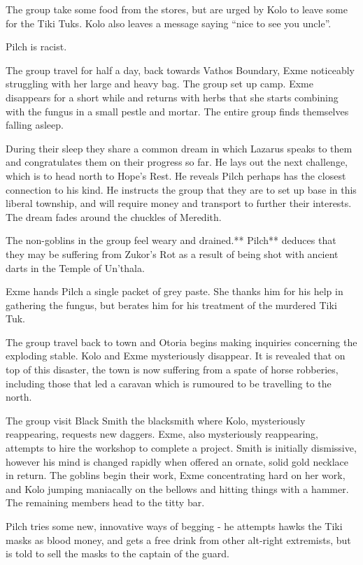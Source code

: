 The group take some food from the stores, but are urged by Kolo to leave some for the Tiki Tuks. Kolo also leaves a message saying “nice to see you uncle”.

Pilch is racist.

The group travel for half a day, back towards Vathos Boundary, Exme noticeably struggling with her large and heavy bag. The group set up camp. Exme disappears for a short while and returns with herbs that she starts combining with the fungus in a small pestle and mortar. The entire group finds themselves falling asleep.

During their sleep they share a common dream in which Lazarus speaks to them and congratulates them on their progress so far. He lays out the next challenge, which is to head north to Hope’s Rest. He reveals Pilch perhaps has the closest connection to his kind. He instructs the group that they are to set up base in this liberal township, and will require money and transport to further their interests. The dream fades around the chuckles of Meredith.

The non-goblins in the group feel weary and drained.** Pilch** deduces that they may be suffering from Zukor’s Rot as a result of being shot with ancient darts in the Temple of Un'thala.

Exme hands Pilch a single packet of grey paste. She thanks him for his help in gathering the fungus, but berates him for his treatment of the murdered Tiki Tuk.

The group travel back to town and Otoria begins making inquiries concerning the exploding stable. Kolo and Exme mysteriously disappear. It is revealed that on top of this disaster, the town is now suffering from a spate of horse robberies, including those that led a caravan which is rumoured to be travelling to the north.

The group visit Black Smith the blacksmith where Kolo, mysteriously reappearing, requests new daggers. Exme, also mysteriously reappearing, attempts to hire the workshop to complete a project. Smith is initially dismissive, however his mind is changed rapidly when offered an ornate, solid gold necklace in return. The goblins begin their work, Exme concentrating hard on her work, and Kolo jumping maniacally on the bellows and hitting things with a hammer. The remaining members head to the titty bar.

Pilch tries some new, innovative ways of begging - he attempts hawks the Tiki masks as blood money, and gets a free drink from other alt-right extremists, but is told to sell the masks to the captain of the guard.

